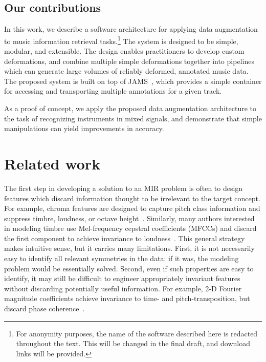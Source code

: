 \documentclass{article}
\begin{document}
\subsection{Our contributions}
In this work, we describe a software architecture for applying data augmentation to music
information retrieval tasks.\footnote{For anonymity purposes, the name of the software
    described here is redacted throughout the text.  This will be changed in the final
draft, and download links will be provided.}
The system is designed to be simple, modular, and
extensible. The design enables practitioners to develop custom deformations, and combine
multiple simple deformations together into pipelines which can generate large volumes of
reliably deformed, annotated music data.  The proposed system is built on top of
JAMS~\cite{humphreyjams}, which provides a simple container for accessing and
transporting multiple annotations for a given track.

As a proof of concept, we apply the proposed data augmentation architecture to the
task of recognizing instruments in mixed signals, and demonstrate that simple
manipulations can yield improvements in accuracy.

\section{Related work}

The first step in developing a solution to an MIR problem is often to
design features which discard information thought to be irrelevant to the target
concept.  For example, chroma features are designed to capture pitch class information
and suppress timbre, loudness, or octave height~\cite{muller2011chroma}.
Similarly, many authors interested in modeling timbre
use Mel-frequency cepstral coefficients (MFCCs) and discard the first component to
achieve invariance to loudness~\cite{pampalk2004matlab}.
This general strategy makes intuitive sense, but it carries many limitations.
First, it is not necessarily easy to identify all relevant symmetries in the
data: if it was, the modeling problem would be essentially solved.
Second, even if such properties are easy to identify, it may still be difficult to
engineer appropriately invariant features without discarding potentially useful
information.  For example, 2-D Fourier magnitude coefficients achieve invariance to
time- and pitch-transposition, but discard phase coherence~\cite{ellis2012large}.
\end{document}
